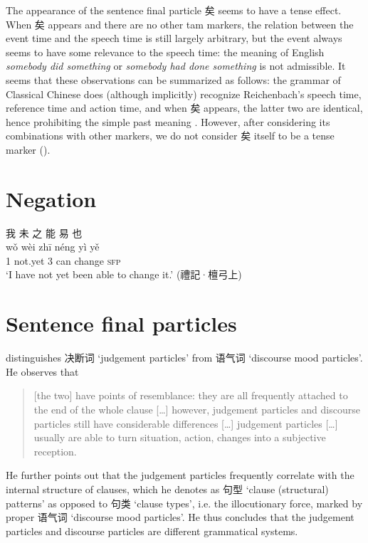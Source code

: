 \documentclass[UTF8, a4paper, oneside, scheme=plain, 12pt]{ctexrep}
\newcommand*{\citepage}[1]{p.~{#1}}
\newcommand*{\citepages}[1]{pp.~{#1}}
\newcommand{\form}[1]{\emph{#1}}
\newcommand{\translate}[1]{`#1'}
\newcommand*{\category}[1]{\textsc{#1}}
\begin{document}
The appearance of the sentence final particle 矣 seems to have a tense effect.
When 矣 appears and there are no other \ac{tam} markers, the relation between the event time and the speech time is still largely arbitrary,
but the event always seems to have some relevance to the speech time:
the meaning of English \form{somebody did something} or \form{somebody had done something} is not admissible.
It seems that these observations can be summarized as follows:
the grammar of Classical Chinese does (although implicitly) recognize Reichenbach's speech time, reference time and action time,
and when 矣 appears, the latter two are identical, hence prohibiting the simple past meaning
 \citep[\citepages{437-446}]{meiguang2018}.
However, after considering its combinations with other markers, we do not consider 矣 itself to be a tense marker ().

\chapter{Negation}

\begin{exe}
        \ex
    \glll
    我 未 之 能 易 也 \\
    wǒ wèi zhī néng yì yě \\
    1 not.yet 3 can change \category{sfp} \\
    \glt\translate{I have not yet been able to change it.} \hfill{(禮記·檀弓上)}
\end{exe}

\chapter{Sentence final particles}

\citet[\citepage{220}]{li2004grammar} distinguishes 决断词 \translate{judgement particles}
from 语气词 \translate{discourse mood particles}. 
He observes that 

\begin{quote}
    [the two] have points of resemblance: they are all frequently attached to the end of the whole clause [\dots]
    however, judgement particles and discourse particles still have considerable differences [\dots] 
    judgement particles [\dots] usually are able to turn situation, action, changes into a subjective reception.
\end{quote}

He further points out that the judgement particles frequently correlate with the internal structure of clauses, which he denotes as 句型 \translate{clause (structural) patterns} as opposed to 句类 \translate{clause types}, i.e. the illocutionary force, marked by proper 语气词 \translate{discourse mood particles}.
He thus concludes that the judgement particles and discourse particles are different grammatical systems.
\end{document}
